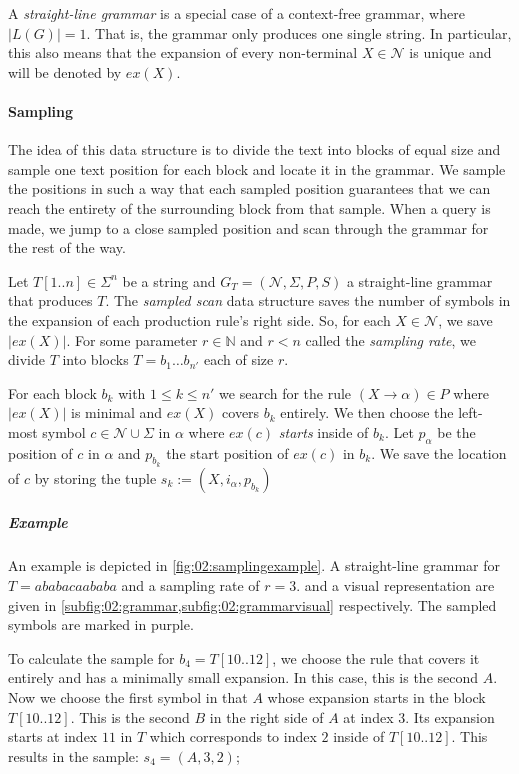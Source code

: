 \documentclass{scrartcl}
\begin{document}
A \emph{straight-line grammar} is a special case of a context-free grammar, where $|L(G)| = 1$.
That is, the grammar only produces one single string. In particular, this also means that the expansion of every non-terminal $X \in \mathcal{N}$ is unique and will be denoted by $ex(X)$.

\paragraph{Sampling} The idea of this data structure is to divide the text into blocks of equal size and sample one text position for each block and locate it in the grammar.
We sample the positions in such a way that each sampled position guarantees that we can reach the entirety of the surrounding block from that sample.
When a query is made, we jump to a close sampled position and scan through the grammar for the rest of the way.

Let $T[1..n] \in \Sigma^n$ be a string and $G_T = (\mathcal{N}, \Sigma, P, S)$ a straight-line grammar that produces $T$.
The \emph{sampled scan} data structure saves the number of symbols in the expansion of each production rule's right side.
So, for each $X \in \mathcal{N}$, we save $|ex(X)|$.
For some parameter $r \in \mathbb{N}$ and $r < n$ called the \emph{sampling rate}, we divide $T$ into blocks $T = b_1 \dots b_{n'}$ each of size $r$.

For each block $b_k$ with $1 \leq k \leq n'$ we search for the rule $(X \rightarrow \alpha) \in P$ where $|ex(X)|$ is minimal and $ex(X)$ covers $b_k$ entirely.
We then choose the left-most symbol $c \in \mathcal{N} \cup \Sigma$ in $\alpha$ where $ex(c)$ \emph{starts} inside of $b_k$.
Let $p_\alpha$ be the position of $c$ in $\alpha$ and $p_{b_k}$ the start position of $ex(c)$ in $b_k$. We save the location of $c$ by storing the tuple $s_k := (X, i_\alpha, p_{b_k})$

\subparagraph{Example}

An example is depicted in \cref{fig:02:samplingexample}.
A straight-line grammar for $T = ababacaababa$ and a sampling rate of $r=3$.
and a visual representation are given in \cref{subfig:02:grammar,subfig:02:grammarvisual} respectively.
The sampled symbols are marked in purple.

To calculate the sample for $b_4 = T[10..12]$, we choose the rule that covers it entirely and has a minimally small expansion.
In this case, this is the second $A$. Now we choose the first symbol in that $A$ whose expansion starts in the block $T[10..12]$.
This is the second $B$ in the right side of $A$  at index $3$. Its expansion starts at index $11$ in $T$ which corresponds to index $2$ inside of $T[10..12]$.
This results in the sample: $s_4 = (A, 3, 2)$;
\end{document}
